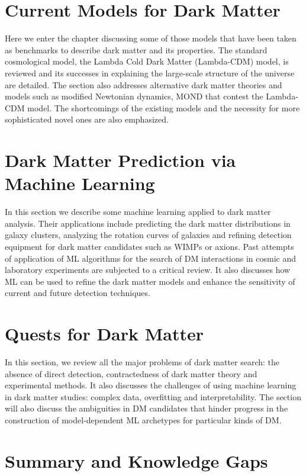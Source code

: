 \section{Current Models for Dark Matter} 

Here we enter the chapter discussing some of those models that have been taken as benchmarks to describe dark matter and its properties. The standard cosmological model, the Lambda Cold Dark Matter (Lambda-CDM) model, is reviewed and its successes in explaining the large-scale structure of the universe are detailed.\cite{peebles1993,dodelson2003} The section also addresses alternative dark matter theories and models such as modified Newtonian dynamics, MOND that contest the Lambda-CDM model.\cite{famaey2012} The shortcomings of the existing models and the necessity for more sophisticated novel ones are also emphasized.

\section{Dark Matter Prediction via Machine Learning} 

In this section we describe some machine learning applied to dark matter analysis. Their applications include predicting the dark matter distributions in galaxy clusters, analyzing the rotation curves of galaxies and refining detection equipment for dark matter candidates such as WIMPs or axions. Past attempts of application of ML algorithms for the search of DM interactions in cosmic and laboratory experiments are subjected to a critical review.\cite{ackermann2015,fermilat2017} It also discusses how ML can be used to refine the dark matter models and enhance the sensitivity of current and future detection techniques.

\section{Quests for Dark Matter} 

In this section, we review all the major problems of dark matter search: the absence of direct detection, contractedness of dark matter theory and experimental methods. It also discusses the challenges of using machine learning in dark matter studies: complex data, overfitting and interpretability. The section will also discuss the ambiguities in DM candidates that hinder progress in the construction of model-dependent ML archetypes for particular kinds of DM.

\section{Summary and Knowledge Gaps}

